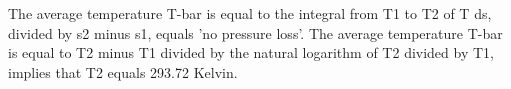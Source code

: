 The average temperature T-bar is equal to the integral from T1 to T2 of T ds, divided by s2 minus s1, equals 'no pressure loss'. 
The average temperature T-bar is equal to T2 minus T1 divided by the natural logarithm of T2 divided by T1, implies that T2 equals 293.72 Kelvin.